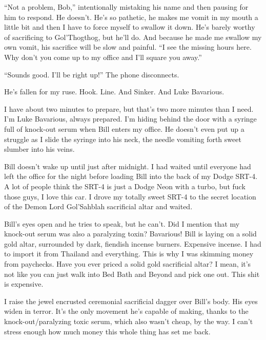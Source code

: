 ``Not a problem, Bob,'' intentionally mistaking his name and then
pausing for him to respond. He doesn't. He's so pathetic, he makes
me vomit in my mouth a little bit and then I have to force myself
to swallow it down. He's barely worthy of sacrificing to
Gol'Thogthog, but he'll do. And because he made me swallow my own
vomit, his sacrifice will be slow and painful. ``I see the missing
hours here. Why don't you come up to my office and I'll square you
away.''



``Sounds good. I'll be right up!'' The phone disconnects.



He's fallen for my ruse. Hook. Line. And Sinker. And Luke
Bavarious.



I have about two minutes to prepare, but that's two more minutes
than I need. I'm Luke Bavarious, always prepared. I'm hiding behind
the door with a syringe full of knock-out serum when Bill enters my
office. He doesn't even put up a struggle as I slide the syringe
into his neck, the needle vomiting forth sweet slumber into his
veins.



Bill doesn't wake up until just after midnight. I had waited until
everyone had left the office for the night before loading Bill into
the back of my Dodge SRT-4. A lot of people think the SRT-4 is just
a Dodge Neon with a turbo, but fuck those guys, I love this car. I
drove my totally sweet SRT-4 to the secret location of the Demon
Lord Gol'Sahblah sacrificial altar and waited.



Bill's eyes open and he tries to speak, but he can't. Did I mention
that my knock-out serum was also a paralyzing toxin? Bavarious!
Bill is laying on a solid gold altar, surrounded by dark, fiendish
incense burners. Expensive incense. I had to import it from
Thailand and everything. This is why I was skimming money from
paychecks. Have you ever priced a solid gold sacrificial altar? I
mean, it's not like you can just walk into Bed Bath and Beyond and
pick one out. This shit is expensive.



I raise the jewel encrusted ceremonial sacrificial dagger over
Bill's body. His eyes widen in terror. It's the only movement he's
capable of making, thanks to the knock-out/paralyzing toxic serum,
which also wasn't cheap, by the way. I can't stress enough how much
money this whole thing has set me back.



